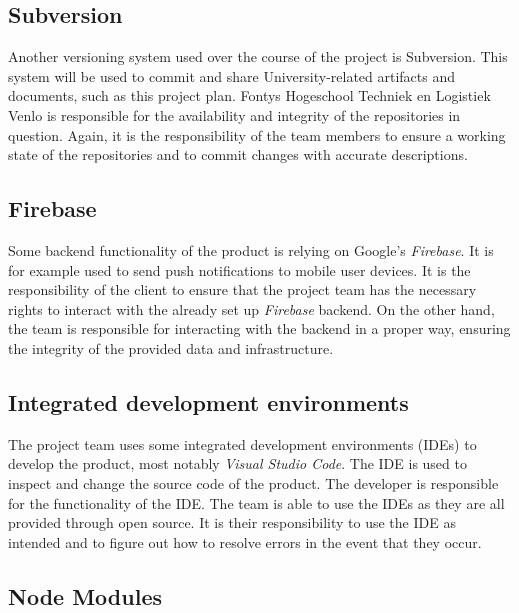 \subsection{Subversion}

Another versioning system used over the course of the project is Subversion. This system will be used to commit and share University-related artifacts and documents, such as this project plan.
\newline
Fontys Hogeschool Techniek en Logistiek Venlo is responsible for the availability and integrity of the repositories in question. Again, it is the responsibility of the team members to ensure a working state of the repositories and to commit changes with accurate descriptions.

\subsection{Firebase}

Some backend functionality of the product is relying on Google's \textit{Firebase}. It is for example used to send push notifications to mobile user devices.
\newline
It is the responsibility of the client to ensure that the project team has the necessary rights to interact with the already set up \textit{Firebase} backend. On the other hand, the team is responsible for interacting with the backend in a proper way, ensuring the integrity of the provided data and infrastructure.

\subsection{Integrated development environments}

The project team uses some integrated development environments (IDEs) to develop the product, most notably \textit{Visual Studio Code}. The IDE is used to inspect and change the source code of the product.
\newline
The developer is responsible for the functionality of the IDE. The team is able to use the IDEs as they are all provided through open source. It is their responsibility to use the IDE as intended and to figure out how to resolve errors in the event that they occur.

\subsection{Node Modules}

